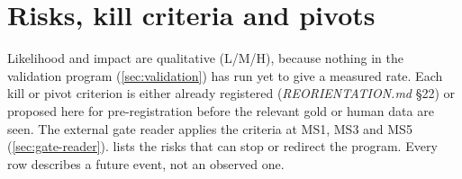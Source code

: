 \section{Risks, kill criteria and pivots}
\label{sec:risks}

Likelihood and impact are qualitative (L/M/H), because nothing in the validation program
(\cref{sec:validation}) has run yet to give a measured rate. Each kill or pivot criterion is either
already registered (\emph{REORIENTATION.md} \S22) or proposed here for pre-registration before the
relevant gold or human data are seen. The external gate reader applies the criteria at MS1, MS3
and MS5 (\cref{sec:gate-reader}).  lists the risks that can stop or redirect the
program. \evfut{} Every row describes a future event, not an observed one.

\begingroup
\footnotesize

